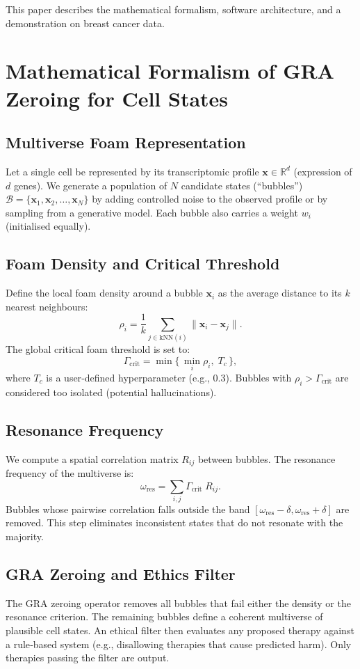 \documentclass[12pt,a4paper]{article}
\begin{document}
This paper describes the mathematical formalism, software architecture, and a demonstration on breast cancer data.

\section{Mathematical Formalism of GRA Zeroing for Cell States}

\subsection{Multiverse Foam Representation}
Let a single cell be represented by its transcriptomic profile $\mathbf{x} \in \mathbb{R}^d$ (expression of $d$ genes). We generate a population of $N$ candidate states (“bubbles”) $\mathcal{B} = \{\mathbf{x}_1, \mathbf{x}_2, \dots, \mathbf{x}_N\}$ by adding controlled noise to the observed profile or by sampling from a generative model. Each bubble also carries a weight $w_i$ (initialised equally).

\subsection{Foam Density and Critical Threshold}
Define the local foam density around a bubble $\mathbf{x}_i$ as the average distance to its $k$ nearest neighbours:
\[
\rho_i = \frac{1}{k} \sum_{j \in \text{kNN}(i)} \|\mathbf{x}_i - \mathbf{x}_j\|.
\]
The global critical foam threshold is set to:
\[
\Gamma_{\text{crit}} = \min\{\, \min_i \rho_i ,\; T_c \,\},
\]
where $T_c$ is a user‑defined hyperparameter (e.g., 0.3). Bubbles with $\rho_i > \Gamma_{\text{crit}}$ are considered too isolated (potential hallucinations).

\subsection{Resonance Frequency}
We compute a spatial correlation matrix $R_{ij}$ between bubbles. The resonance frequency of the multiverse is:
\[
\omega_{\text{res}} = \sum_{i,j} \Gamma_{\text{crit}} \; R_{ij}.
\]
Bubbles whose pairwise correlation falls outside the band $[\omega_{\text{res}}-\delta, \omega_{\text{res}}+\delta]$ are removed. This step eliminates inconsistent states that do not resonate with the majority.

\subsection{GRA Zeroing and Ethics Filter}
The GRA zeroing operator removes all bubbles that fail either the density or the resonance criterion. The remaining bubbles define a coherent multiverse of plausible cell states. An ethical filter then evaluates any proposed therapy against a rule‑based system (e.g., disallowing therapies that cause predicted harm). Only therapies passing the filter are output.
\end{document}

